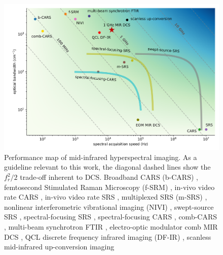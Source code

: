 \documentclass[aip,reprint]{revtex4-1}
\begin{document}
\begin{figure}[!h]
    \centering
    \includegraphics[width=\linewidth]{bckgnd_with_cm_v3.png}
    \caption{Performance map of mid-infrared hyperspectral imaging. As a guideline relevant to this work, the diagonal dashed lines show the $f_r^2/2$ trade-off inherent to DCS. Broadband CARS (b-CARS) \cite{keeSimpleApproachOnelaser2004}, femtosecond Stimulated Raman Microscopy (f-SRM) \cite{ploetzFemtosecondStimulatedRaman2007}, in-vivo video rate CARS \cite{evansChemicalImagingTissue2005}, in-vivo video rate SRS \cite{saarVideoRateMolecularImaging2010}, multiplexed SRS (m-SRS) \cite{fuQuantitativeChemicalImaging2012,liaoMicrosecondScaleVibrational2015}, nonlinear interferometric vibrational imaging (NIVI) \cite{chowdaryMolecularHistopathologySpectrally2010}, swept-source SRS \cite{ozekiHighspeedMolecularSpectral2012}, spectral-focusing SRS \cite{fuHyperspectralImagingStimulated2013, linMicrosecondFingerprintStimulated2021}, spectral-focusing CARS \cite{dinapoliHyperspectralDifferentialCARS2014}, comb-CARS \cite{ideguchiCoherentRamanSpectroimaging2013}, multi-beam synchrotron FTIR \cite{nasseHighresolutionFouriertransformInfrared2011}, electro-optic modulator comb MIR DCS \cite{ullahkhanDirectHyperspectralDualcomb2020}, QCL discrete frequency infrared imaging (DF-IR) \cite{yehFastInfraredChemical2015}, scanless mid-infrared up-conversion imaging \cite{zhaoHighspeedScanlessEntire2023}}
    \label{fig:bckgnd}
\end{figure}

\end{document}
